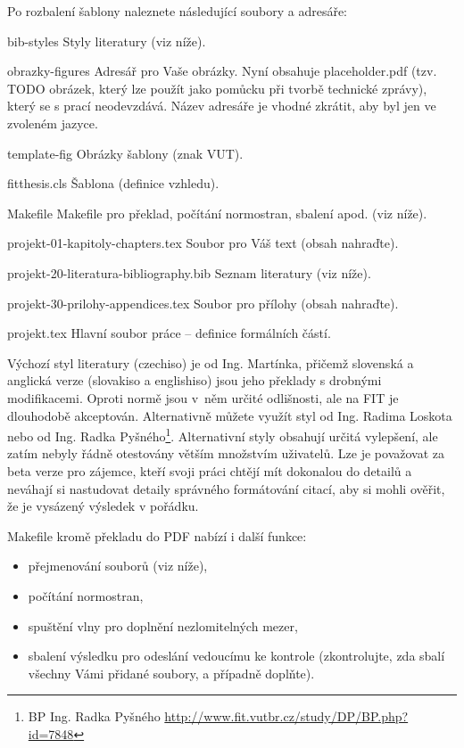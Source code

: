 Po rozbalení šablony naleznete následující soubory a adresáře:
\begin{DESCRIPTION}
  \item [bib-styles] Styly literatury (viz níže).
  \item [obrazky-figures] Adresář pro Vaše obrázky. Nyní obsahuje placeholder.pdf (tzv. TODO obrázek, který lze použít jako pomůcku při tvorbě technické zprávy), který se s prací neodevzdává. Název adresáře je vhodné zkrátit, aby byl jen ve zvoleném jazyce.
  \item [template-fig] Obrázky šablony (znak VUT).
  \item [fitthesis.cls] Šablona (definice vzhledu).
  \item [Makefile] Makefile pro překlad, počítání normostran, sbalení apod. (viz níže).
  \item [projekt-01-kapitoly-chapters.tex] Soubor pro Váš text (obsah nahraďte).
  \item [projekt-20-literatura-bibliography.bib] Seznam literatury (viz níže).
  \item [projekt-30-prilohy-appendices.tex] Soubor pro přílohy (obsah nahraďte).
  \item [projekt.tex] Hlavní soubor práce -- definice formálních částí.
\end{DESCRIPTION}

Výchozí styl literatury (czechiso) je od Ing. Martínka, přičemž slovenská a anglická verze (slovakiso a englishiso) jsou jeho překlady s drobnými modifikacemi. Oproti normě jsou v~něm určité odlišnosti, ale na FIT je dlouhodobě akceptován. Alternativně můžete využít styl od Ing. Radima Loskota nebo od Ing. Radka Pyšného\footnote{BP Ing. Radka Pyšného \url{http://www.fit.vutbr.cz/study/DP/BP.php?id=7848}}. Alternativní styly obsahují určitá vylepšení, ale zatím nebyly řádně otestovány větším množstvím uživatelů. Lze je považovat za beta verze pro zájemce, kteří svoji práci chtějí mít dokonalou do detailů a neváhají si nastudovat detaily správného formátování citací, aby si mohli ověřit, že je vysázený výsledek v pořádku.

\begin{samepage}
Makefile kromě překladu do PDF nabízí i další funkce:
\begin{itemize}
  \item přejmenování souborů (viz níže),
  \item počítání normostran,
  \item spuštění vlny pro doplnění nezlomitelných mezer,
  \item sbalení výsledku pro odeslání vedoucímu ke kontrole (zkontrolujte, zda sbalí všechny Vámi přidané soubory, a případně doplňte).
\end{itemize}
\end{samepage}

